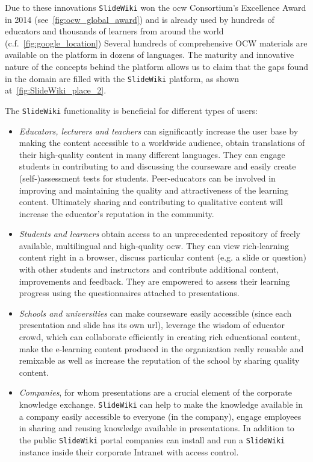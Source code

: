 \documentclass[PhD, Submit, ngerman,UKenglish,table]{scrbook}
\begin{document}
Due to these innovations \texttt{SlideWiki} won the \gls{ocw} Consortium's Excellence Award in 2014 (see~\autoref{fig:ocw_global_award}) and is already used by hundreds of educators and thousands of learners from around the world (c.f.~\autoref{fig:google_location})
Several hundreds of comprehensive OCW materials are available on the platform in dozens of languages.
The maturity and innovative nature of the concepts behind the platform allows us to claim that the gaps found in the domain are filled with the \texttt{SlideWiki} platform, as shown at~\autoref{fig:SlideWiki_place_2}.

The \texttt{SlideWiki} functionality is beneficial for different types of users:
\begin{itemize}
\item \emph{Educators, lecturers and teachers} can significantly increase the user base by making the content accessible to a worldwide audience, obtain translations of their high-quality content in many different languages.
They can engage students in contributing to and discussing the courseware and easily create (self-)assessment tests for students.
Peer-educators can be involved in improving and maintaining the quality and attractiveness of the learning content.
Ultimately sharing and contributing to qualitative content will increase the educator's reputation in the community.
\item \emph{Students and learners} obtain access to an unprecedented repository of freely available, multilingual and high-quality \gls{ocw}.
They can view rich-learning content right in a browser, discuss particular content (e.g. a slide or question) with other students and instructors and contribute additional content, improvements and feedback.
They are empowered to assess their learning progress using the questionnaires attached to presentations.
\item \emph{Schools and universities} can make courseware easily accessible (since each presentation and slide has its own \gls{url}), leverage the wisdom of educator crowd, which can collaborate efficiently in creating rich educational content, make the e-learning content produced in the organization really reusable and remixable as well as increase the reputation of the school by sharing quality content.
\item \emph{Companies}, for whom presentations are a crucial element of the corporate knowledge exchange.
\texttt{SlideWiki} can help to make the knowledge available in a company easily accessible to everyone (in the company), engage employees in sharing and reusing knowledge available in presentations.
In addition to the public \texttt{SlideWiki} portal companies can install and run a \texttt{SlideWiki} instance inside their corporate Intranet with access control.
\end{itemize}
\end{document}
